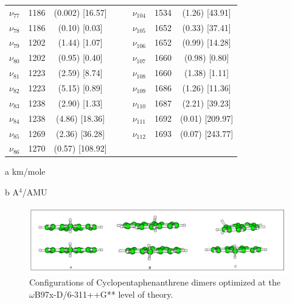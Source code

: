 \begin{table}[H]
\begin{center}
\begin{threeparttable}
\begin{tabular}{c c c c c c c c}
$\nu_{77}$	&	1186&	(0.002)	[16.57]	&	&	&	$\nu_{104}$	&1534	&	(1.26)	[43.91]\\
$\nu_{78}$	&	1186&	(0.10)	[0.03]	&	&	&	$\nu_{105}$	&1652	&	(0.33)	[37.41]\\
$\nu_{79}$	&	1202&	(1.44)	[1.07]	&	&	&	$\nu_{106}$	&1652	&	(0.99)	[14.28]\\
$\nu_{80}$	&	1202&	(0.95)	[0.40]	&	&	&	$\nu_{107}$	&1660	&	(0.98)	[0.80]\\
$\nu_{81}$	&	1223&	(2.59)	[8.74]	&	&	&	$\nu_{108}$	&1660	&	(1.38)	[1.11]\\
$\nu_{82}$	&	1223&	(5.15)	[0.89]	&	&	&	$\nu_{109}$	&1686	&	(1.26)	[11.36]\\
$\nu_{83}$	&	1238&	(2.90)	[1.33]	&	&	&	$\nu_{110}$	&1687	&	(2.21)	[39.23]\\
$\nu_{84}$	&	1238&	(4.86)	[18.36]	&	&	&	$\nu_{111}$	&1692	&	(0.01)	[209.97]\\
$\nu_{85}$	&	1269&(2.36)	[36.28]	&	&	&	$\nu_{112}$	&	1693&	(0.07) [243.77]\\ $\nu_{86}$	&	1270	&	(0.57)	[108.92]	&	&	&	&  &  \\				
					
					\bottomrule
				\end{tabular}
				
				\begin{tablenotes}
					\item[a] km/mole
					\item[b] A$^{4}$/AMU
				\end{tablenotes}
			\end{threeparttable}
		\end{center}
		\label{freq-FluoreneDi}
	\end{table}					


\begin{figure}[H]
	\begin{center}
		\includegraphics[scale=0.9]{anex/image/TCC}
	\end{center}
	\caption{ Configurations of Cyclopentaphenanthrene dimers optimized at the $\omega$B97x-D/6-311++G** level of theory. }
\end{figure}


